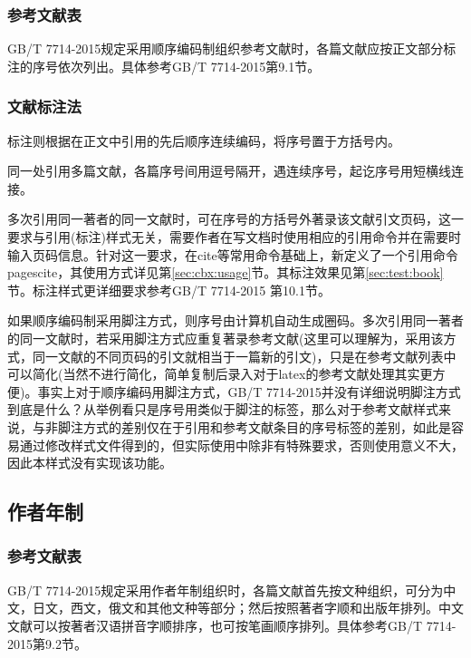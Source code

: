 \subsubsection{参考文献表}\label{sec:bib:serialno}

GB/T 7714-2015规定采用顺序编码制组织参考文献时，各篇文献应按正文部分标注的序号依次列出。具体参考GB/T 7714-2015第9.1节。

\subsubsection{文献标注法}
标注则根据在正文中引用的先后顺序连续编码，将序号置于方括号内。

同一处引用多篇文献，各篇序号间用逗号隔开，遇连续序号，起讫序号用短横线连接。

多次引用同一著者的同一文献时，可在序号的方括号外著录该文献引文页码，这一要求与引用(标注)样式无关，需要作者在写文档时使用相应的引用命令并在需要时输入页码信息。针对这一要求，在cite等常用命令基础上，新定义了一个引用命令pagescite，其使用方式详见第\ref{sec:cbx:usage}节。其标注效果见第\ref{sec:test:book}节。标注样式更详细要求参考GB/T 7714-2015 第10.1节。

如果顺序编码制采用脚注方式，则序号由计算机自动生成圈码。多次引用同一著者的同一文献时，若采用脚注方式应重复著录参考文献(这里可以理解为，采用该方式，同一文献的不同页码的引文就相当于一篇新的引文)，只是在参考文献列表中可以简化(当然不进行简化，简单复制后录入对于latex的参考文献处理其实更方便)。事实上对于顺序编码用脚注方式，GB/T 7714-2015并没有详细说明脚注方式到底是什么？从举例看只是序号用类似于脚注的标签，那么对于参考文献样式来说，与非脚注方式的差别仅在于引用和参考文献条目的序号标签的差别，如此是容易通过修改样式文件得到的，但实际使用中除非有特殊要求，否则使用意义不大，因此本样式没有实现该功能。

\subsection{作者年制}

\subsubsection{参考文献表}

GB/T 7714-2015规定采用作者年制组织时，各篇文献首先按文种组织，可分为中文，日文，西文，俄文和其他文种等部分；然后按照著者字顺和出版年排列。中文文献可以按著者汉语拼音字顺排序，也可按笔画顺序排列。具体参考GB/T 7714-2015第9.2节。


